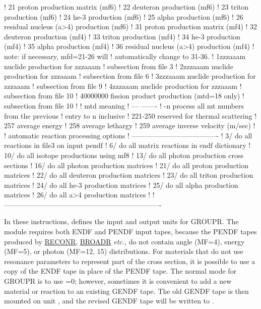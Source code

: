 \begin{ccode}
   !     21           proton production matrix (mf6)
   !     22           deuteron production (mf6)
   !     23           triton production (mf6)
   !     24           he-3 production (mf6)
   !     25           alpha production (mf6)
   !     26           residual nucleus (a>4) production (mf6)
   !     31           proton production matrix (mf4)
   !     32           deuteron production (mf4)
   !     33           triton production (mf4)
   !     34           he-3 production (mf4)
   !     35           alpha production (mf4)
   !     36           residual nucleus (a>4) production (mf4)
   !          note: if necessary, mfd=21-26 will
   !          automatically change to 31-36.
   !    1zzzaaam       nuclide production for zzzaaam
   !                     subsection from file 3
   !    2zzzaaam       nuclide production for zzzaaam
   !                     subsection from file 6
   !    3zzzaaam       nuclide production for zzzaaam
   !                     subsection from file 9
   !    4zzzaaam       nuclide production for zzzaaam
   !                     subsection from file 10
   !    40000000       fission product production (mtd=18 only)
   !                     subsection from file 10
   !
   !     mtd          meaning
   !     ---          -------
   !     -n           process all mt numbers from the previous
   !                          entry to n inclusive
   !     221-250      reserved for thermal scattering
   !     257          average energy
   !     258          average lethargy
   !     259          average inverse velocity (m/sec)
   !
   !     automatic reaction processing options
   !     -------------------------------------
   !        3/        do all reactions in file3 on input pendf
   !        6/        do all matrix reactions in endf dictionary
   !       10/        do all isotope productions using mf8
   !       13/        do all photon production cross sections
   !       16/        do all photon production matrices
   !       21/        do all proton production matrices
   !       22/        do all deuteron production matrices
   !       23/        do all triton production matrices
   !       24/        do all he-3 production matrices
   !       25/        do all alpha production matrices
   !       26/        do all a>4 production matrices
   !
   !-------------------------------------------------------------------

\end{ccode}
\normalsize

In these instructions,  defines the input and output units
for GROUPR.  The module requires both ENDF and PENDF input tapes,
because the PENDF tapes produced by
\hyperlink{sRECONRhy}{RECONR},
\hyperlink{sBROADRhy}{BROADR} {\it etc.}, do not
contain angle (MF=4),
energy (MF=5), or photon (MF=12, 15) distributions.  For materials
that do not use resonance parameters to represent part of the
cross section, it is possible to use a copy of the ENDF tape in place
of the PENDF tape.  The normal mode for GROUPR is to use =0;
however, sometimes it is convenient to add a new material or reaction to
an existing GENDF tape.  The old GENDF tape is then mounted on unit
, and the revised GENDF tape will be written to .

